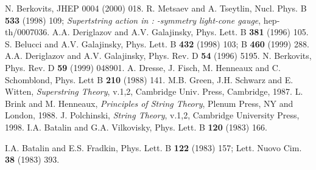 \documentclass[a4paper]{article}
\begin{document}
\begin{thebibliography}{nn}
\bibitem{} N. Berkovits, JHEP 0004 (2000) 018.
\bibitem{} R. Metsaev and A. Tseytlin, Nucl. Phys. B {\bf 533} (1998) 
109; {\em Supertstring action in \coordHE{}: \myHighlight{$\kappa$}\coordHE{}-symmetry 
light-cone gauge}, hep-th/0007036.
\bibitem{} A.A. Deriglazov and A.V. Galajinsky,  
Phys. Lett. B {\bf 381} (1996) 105.
\bibitem{} S. Belucci and A.V. Galajinsky,
Phys. Lett. B {\bf 432} (1998) 103; B {\bf 460} (1999) 288.
\bibitem{} A.A. Deriglazov and A.V. Galajinsky,
Phys. Rev. D {\bf 54} (1996) 5195.
\bibitem{} N. Berkovits, Phys. Rev. D {\bf 59} (1999) 048901.
\bibitem{} A. Dresse, J. Fisch, M. Henneaux and C. Schomblond, 
Phys. Lett B {\bf 210} (1988) 141.
\bibitem{} M.B. Green, J.H. Schwarz and E. Witten,
{\it{Superstring Theory}}, v.1,2, Cambridge Univ. Press, Cambridge, 1987. 
\bibitem{} L. Brink and M. Henneaux, {\it{Principles of String Theory}},
Plenum Press, NY and London, 1988.
\bibitem{} J. Polchinski, {\it{String Theory}}, v.1,2,
Cambridge University Press, 1998.
 I.A. Batalin and G.A. Vilkovisky, Phys.  
Lett. B {\bf 120} (1983) 166.
\item{} I.A. Batalin and E.S. Fradkin, Phys. Lett. B {\bf 122} (1983) 157;
Lett. Nuovo Cim. {\bf 38} (1983) 393.
\end{thebibliography}
\end{document}
